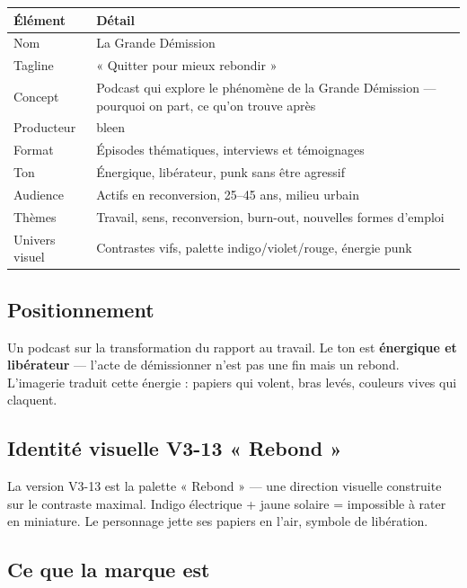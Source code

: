 \documentclass[a4paper,11pt]{article}
\newcommand{\tableheader}{\rowcolor{tableHeader}\bfseries}
\begin{document}
\begin{tcolorbox}[card]
\begin{tabularx}{\textwidth}{@{}lX@{}}
\toprule
\tableheader Élément & Détail \\
\midrule
Nom & La Grande Démission \\
Tagline & « Quitter pour mieux rebondir » \\
Concept & Podcast qui explore le phénomène de la Grande Démission — pourquoi on part, ce qu'on trouve après \\
Producteur & bleen \\
Format & Épisodes thématiques, interviews et témoignages \\
Ton & Énergique, libérateur, punk sans être agressif \\
Audience & Actifs en reconversion, 25--45 ans, milieu urbain \\
Thèmes & Travail, sens, reconversion, burn-out, nouvelles formes d'emploi \\
Univers visuel & Contrastes vifs, palette indigo/violet/rouge, énergie punk \\
\bottomrule
\end{tabularx}
\end{tcolorbox}

\subsection{Positionnement}

Un podcast sur la transformation du rapport au travail. Le ton est \textbf{énergique et libérateur} — l'acte de démissionner n'est pas une fin mais un rebond. L'imagerie traduit cette énergie : papiers qui volent, bras levés, couleurs vives qui claquent.

\subsection{Identité visuelle V3-13 « Rebond »}

La version V3-13 est la palette « Rebond » — une direction visuelle construite sur le contraste maximal. Indigo électrique + jaune solaire = impossible à rater en miniature. Le personnage jette ses papiers en l'air, symbole de libération.

\subsection{Ce que la marque est}
\end{document}
